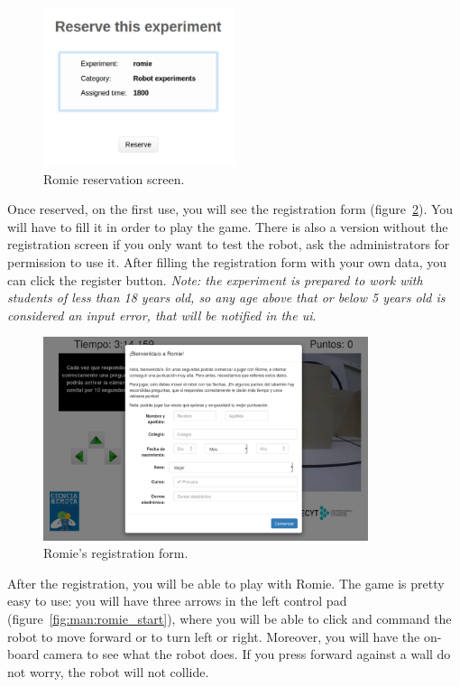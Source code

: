 \begin{figure}[!htbp]
	\centering
	\includegraphics[width=0.5\textwidth]{fig/manuals/trivial/romie-reserve}
	\caption{Romie reservation screen.}
	\label{fig:man:romie_reserve}
\end{figure}

Once reserved, on the first use, you will see the registration form
(figure~\ref{fig:man:romie_register}). You will have to fill it in order to play the game. There is
also a version without the registration screen if you only want to test the robot, ask the
administrators for permission to use it. After filling the registration form  with your own data,
you can click the register button. \emph{Note: the experiment is prepared to work with students of
less than 18 years old, so any age above that or below 5 years old is considered an input error,
that will be notified in the \acrlong{ui}}.

\begin{figure}[!htbp]
	\centering
	\includegraphics[width=0.85\textwidth]{fig/manuals/trivial/romie-register}
	\caption{Romie's registration form.}
	\label{fig:man:romie_register}
\end{figure}

After the registration, you will be able to play with Romie. The game is pretty easy to use: you
will have three arrows in the left control pad (figure~\ref{fig:man:romie_start}), where you will be
able to click and command the robot to move forward or to turn left or right. Moreover, you will
have the on-board camera to see what the robot does. If you press forward against a wall do not
worry, the robot will not collide.

